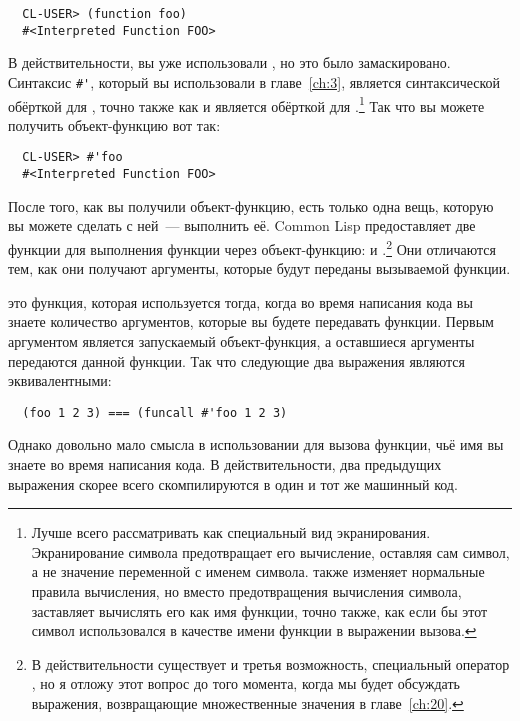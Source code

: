 \begin{verbatim}
  CL-USER> (function foo)
  #<Interpreted Function FOO>
\end{verbatim}

В действительности, вы уже использовали , но это было
замаскировано. Синтаксис \lstinline!#'!, который вы использовали в
главе~\ref{ch:3}, является синтаксической обёрткой для , точно
также как и  является обёрткой для .\footnote{Лучше всего
  рассматривать  как специальный вид экранирования.
  Экранирование символа предотвращает его вычисление, оставляя сам символ, а не
  значение переменной с именем символа.  также изменяет
  нормальные правила вычисления, но вместо предотвращения вычисления символа,
  заставляет вычислять его как имя функции, точно также, как если бы этот символ
  использовался в качестве имени функции в выражении вызова.}  Так что вы можете
  получить объект-функцию вот так:

\begin{verbatim}
  CL-USER> #'foo
  #<Interpreted Function FOO>
\end{verbatim}

После того, как вы получили объект-функцию, есть только одна вещь, которую вы можете
сделать с ней~--- выполнить её. Common Lisp предоставляет две функции для выполнения
функции через объект-функцию:  и .\footnote{В действительности
  существует и третья возможность, специальный оператор , но я
  отложу этот вопрос до того момента, когда мы будет обсуждать выражения, возвращающие
  множественные значения в главе~\ref{ch:20}.} Они отличаются тем, как они получают
  аргументы, которые будут переданы вызываемой функции.

 это функция, которая используется тогда, когда во время написания кода вы
знаете количество аргументов, которые вы будете передавать функции.  Первым аргументом
 является запускаемый объект-функция, а оставшиеся аргументы передаются
данной функции.  Так что следующие два выражения являются эквивалентными:

\begin{verbatim}
  (foo 1 2 3) === (funcall #'foo 1 2 3)
\end{verbatim}

Однако довольно мало смысла в использовании  для вызова функции, чьё имя вы
знаете во время написания кода.  В действительности, два предыдущих выражения скорее всего
скомпилируются в один и тот же машинный код.

